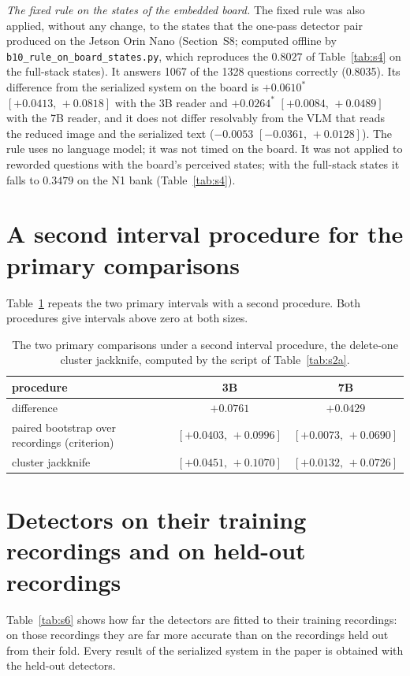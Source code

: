 \documentclass[10pt]{article}
\renewcommand{\thetable}{S\arabic{table}}
\newcommand{\settab}[1]{\setcounter{table}{#1}\addtocounter{table}{-1}\renewcommand{\thetable}{S\arabic{table}}}
\begin{document}
\emph{The fixed rule on the states of the embedded board.} The fixed rule was also applied, without any change, to the states that the one-pass detector pair produced on the Jetson Orin Nano (Section~S8; computed offline by \texttt{b10\_rule\_on\_board\_states.py}, which reproduces the $0.8027$ of Table~\ref{tab:s4} on the full-stack states). It answers 1067 of the 1328 questions correctly (0.8035). Its difference from the serialized system on the board is $+0.0610^{*}$ $[+0.0413,\,+0.0818]$ with the 3B reader and $+0.0264^{*}$ $[+0.0084,\,+0.0489]$ with the 7B reader, and it does not differ resolvably from the VLM that reads the reduced image and the serialized text ($-0.0053$ $[-0.0361,\,+0.0128]$). The rule uses no language model; it was not timed on the board. It was not applied to reworded questions with the board's perceived states; with the full-stack states it falls to $0.3479$ on the N1 bank (Table~\ref{tab:s4}).

\section{A second interval procedure for the primary comparisons}
Table~\ref{tab:s5} repeats the two primary intervals with a second procedure. Both procedures give intervals above zero at both sizes.

\settab{5}\begin{table}[h]\centering\footnotesize
\caption{The two primary comparisons under a second interval procedure, the delete-one cluster jackknife, computed by the script of Table~\ref{tab:s2a}.}\label{tab:s5}
\begin{tabular}{@{}lcc@{}}
\toprule procedure & 3B & 7B \\ \midrule
difference & $+0.0761$ & $+0.0429$ \\
paired bootstrap over recordings (criterion) & $[+0.0403,\,+0.0996]$ & $[+0.0073,\,+0.0690]$ \\
cluster jackknife & $[+0.0451,\,+0.1070]$ & $[+0.0132,\,+0.0726]$ \\
\bottomrule
\end{tabular}
\end{table}

\section{Detectors on their training recordings and on held-out recordings}
Table~\ref{tab:s6} shows how far the detectors are fitted to their training recordings: on those recordings they are far more accurate than on the recordings held out from their fold. Every result of the serialized system in the paper is obtained with the held-out detectors.
\end{document}
